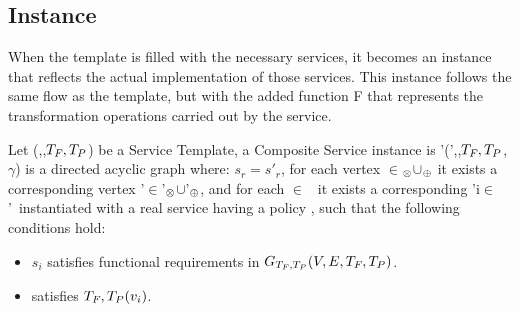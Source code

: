 
\subsection{Instance}
When the template is filled with the necessary services, it becomes an instance that reflects the actual implementation of those services. This instance follows the same flow as the template, but with the added function F that represents the transformation operations carried out by the service.

Let \T(\V,\E,$T_{F_{}},T_P$) be a Service Template, a Composite Service instance is \T'(\V',\E,$T_{F_{}},T_P$,$\gamma$) is a directed acyclic graph where:
$s_r=s'_r$, for each vertex \vi{}$\in$\V$_{\otimes}$$\cup$\V$_{\oplus}$ it exists a corresponding vertex \vi{}'$\in$\V'$_{\otimes}$$\cup$\V'$_{\oplus}$,
    and for each $\in$ \V\ it exists a corresponding \vi'{i}$\in$ \V'\ instantiated with a real service  having a policy , such that the following conditions hold:
    \begin{itemize}
      \item $s_i$ satisfies functional requirements in $G_{T_{F_{}},T_P}(V,E,T_{F_{}},T_P)$.
      \item {} satisfies $T_{F_{}},T_P(v_i)$.
    \end{itemize}

